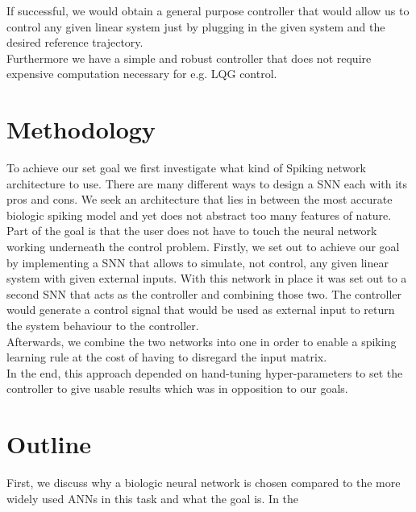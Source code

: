 If successful, we would obtain a general purpose controller that would allow us to control any given linear system just by plugging in the given system and the desired reference trajectory.\\
Furthermore we have a simple and robust controller that does not require expensive computation necessary for e.g. LQG control.

\section{Methodology}
To achieve our set goal we first investigate what kind of Spiking network architecture to use. There are many different ways to design a \ac{SNN} each with its pros and cons.
We seek an architecture that lies in between the most accurate biologic spiking model and yet does not abstract too many features of nature.\\
Part of the goal is that the user does not have to touch the neural network working underneath the control problem.
Firstly, we set out to achieve our goal by implementing a \ac{SNN} that allows to simulate, not control, any given linear system with given external inputs. With this network in place it was set out to a second \ac{SNN} that acts as the controller and combining those two. The controller would generate a control signal that would be used as external input to return the system behaviour to the controller.\\
Afterwards, we combine the two networks into one in order to enable a spiking learning rule at the cost of having to disregard the input matrix.\\

In the end, this approach depended on hand-tuning hyper-parameters to set the controller to give usable results which was in opposition to our goals.\\

\section{Outline}
First, we discuss why a biologic neural network is chosen compared to the more widely used \acp{ANN} in this task and what the goal is. In the